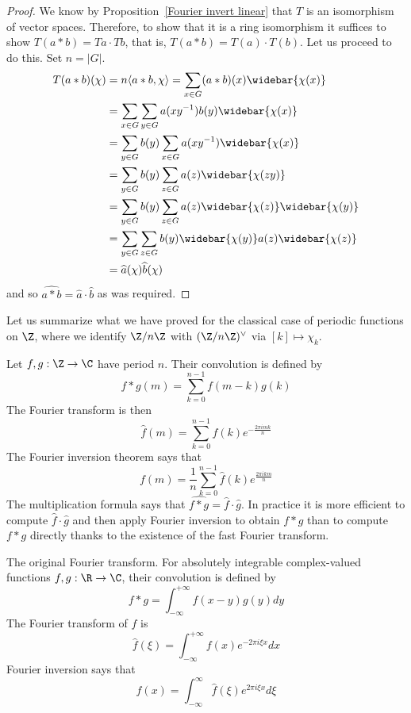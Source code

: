 \begin{proof}
We know by Proposition~\ref{Fourier invert linear} that $T$ is an isomorphism of vector spaces. Therefore, to show that it is a ring isomorphism it suffices to show $T(a\ast b)=Ta\cdot Tb$, that is, $T(a\ast b)=T(a)\cdot T(b)$. Let us proceed to do this. Set $n=|G|$.
\begin{align*}
T(a\ast b)(\chi)&=n\langle a\ast b,\chi\rangle=\sum_{x\in G}(a\ast b)(x)\widebar{\chi(x)}\\
&=\sum_{x\in G}\sum_{y\in G}a(xy^{-1})b(y)\widebar{\chi(x)}\\
&=\sum_{y\in G}b(y)\sum_{x\in G}a(xy^{-1})\widebar{\chi(x)}\\
&=\sum_{y\in G}b(y)\sum_{z\in G}a(z)\widebar{\chi(zy)}\\
&=\sum_{y\in G}b(y)\sum_{z\in G}a(z)\widebar{\chi(z)}\widebar{\chi(y)}\\
&=\sum_{y\in G}\sum_{z\in G}b(y)\widebar{\chi(y)}a(z)\widebar{\chi(z)}\\
&=\widehat{a}(\chi)\widehat{b}(\chi)
\end{align*}
and so $\widehat{a\ast b}=\widehat{a}\cdot\widehat{b}$ as was required.
\end{proof}
Let us summarize what we have proved for the classical case of periodic
functions on $\Z$, where we identify $\Z/n\Z$ with $(\Z/n\Z)^\vee$ via $[k]\mapsto\chi_k$.
\begin{example}
Let $f,g:\Z\to\C$ have period $n$. Their convolution is defined by
\[f\ast g(m)=\sum_{k=0}^{n-1}f(m-k)g(k)\]
The Fourier transform is then
\[\widehat{f}(m)=\sum_{k=0}^{n-1}f(k)e^{-\frac{2\pi imk}{n}}\]
The Fourier inversion theorem says that
\[f(m)=\frac{1}{n}\sum_{k=0}^{n-1}\widehat{f}(k)e^{\frac{2\pi ikm}{n}}\]
The multiplication formula says that $\widehat{f\ast g}=\widehat{f}\cdot\widehat{g}$. In practice it is more efficient to compute $\widehat{f}\cdot\widehat{g}$ and then apply Fourier inversion to obtain $f\ast g$ than to compute $f\ast g$ directly thanks to the existence of the fast Fourier transform.
\end{example}
\begin{remark}
The original Fourier transform. For absolutely integrable complex-valued
functions $f,g:\R\to\C$, their convolution is defined by
\[f\ast g=\int_{-\infty}^{+\infty}f(x-y)g(y)dy\]
The Fourier transform of $f$ is
\[\widehat{f}(\xi)=\int_{-\infty}^{+\infty}f(x)e^{-2\pi i\xi x}dx\]
Fourier inversion says that
\[f(x)=\int_{-\infty}^{\infty}\widehat{f}(\xi)e^{2\pi i\xi x}d\xi\]
\end{remark}
